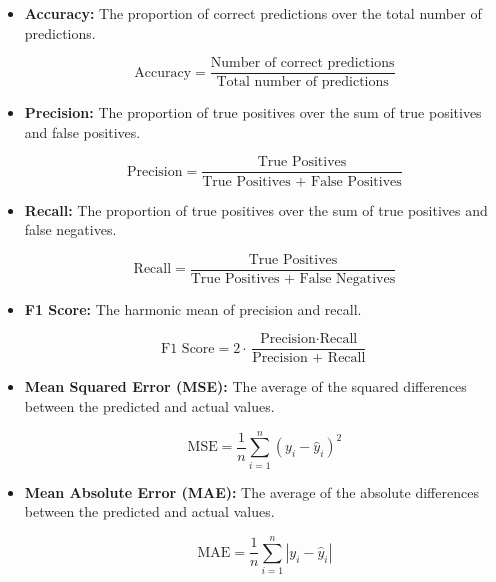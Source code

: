 \begin{itemize}
    \item \textbf{Accuracy:} The proportion of correct predictions over the total number of predictions.

    \begin{equation}
    \text{Accuracy} = \frac{\text{Number of correct predictions}}{\text{Total number of predictions}}
    \end{equation}

    \item \textbf{Precision:} The proportion of true positives over the sum of true positives and false positives.

    \begin{equation}
    \text{Precision} = \frac{\text{True Positives}}{\text{True Positives + False Positives}}
    \end{equation}

    \item \textbf{Recall:} The proportion of true positives over the sum of true positives and false negatives.

    \begin{equation}
    \text{Recall} = \frac{\text{True Positives}}{\text{True Positives + False Negatives}}
    \end{equation}

    \item \textbf{F1 Score:} The harmonic mean of precision and recall.

    \begin{equation}
    \text{F1 Score} = 2 \cdot \frac{\text{Precision} \cdot \text{Recall}}{\text{Precision + Recall}}
    \end{equation}

    \item \textbf{Mean Squared Error (MSE):} The average of the squared differences between the predicted and actual values.

    \begin{equation}
    \text{MSE} = \frac{1}{n} \sum_{i=1}^n (y_i - \hat{y}_i)^2
    \end{equation}

    \item \textbf{Mean Absolute Error (MAE):} The average of the absolute differences between the predicted and actual values.

    \begin{equation}
    \text{MAE} = \frac{1}{n} \sum_{i=1}^n |y_i - \hat{y}_i|
    \end{equation}
\end{itemize}

